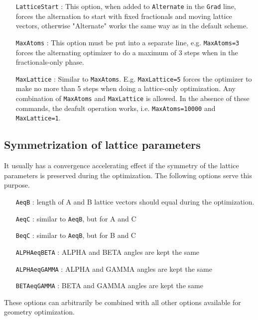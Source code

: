 \documentclass[prl,aps,preprint,superbib,12pt]{revtex4}
\begin{document}
\begin{itemize}
\item[{\tt LatticeStart}] :
This option, when added to {\tt Alternate} in the {\tt Grad} line,
forces the alternation to start with fixed fractionals and moving
lattice vectors, otherwise "Alternate" works the same way as in the 
default scheme.
\end{itemize}

\begin{itemize}
\item[{\tt MaxAtoms}] :
This option must be put into a separate line, e.g. {\tt MaxAtoms=3}
forces the alternating optimizer to do a maximum of 3 steps 
when in the fractionals-only phase.    
\end{itemize}

\begin{itemize}
\item[{\tt MaxLattice}] :
Similar to {\tt MaxAtoms}. E.g. {\tt MaxLattice=5} forces the optimizer
to make no more than 5 steps when doing a lattice-only optimization.
Any combination of {\tt MaxAtoms} and {\tt MaxLattice} is allowed.
In the absence of these commands, the deafult operation works, i.e.
{\tt MaxAtoms=10000} and {\tt MaxLattice=1}.
\end{itemize}

\subsection{Symmetrization of lattice parameters}
It usually has a convergence accelerating effect if the symmetry of the
lattice parameters is preserved during the optimization.
The following options serve this purpose.
\begin{itemize}
\item[{\tt AeqB}] : length of A and B lattice vectors should equal 
during the optimization.
\item[{\tt AeqC}] : similar to {\tt AeqB}, but for A and C
\item[{\tt BeqC}] : similar to {\tt AeqB}, but for B and C
\item[{\tt ALPHAeqBETA}] : ALPHA and BETA angles are kept the same
\item[{\tt ALPHAeqGAMMA}] : ALPHA and GAMMA angles are kept the same
\item[{\tt BETAeqGAMMA}] : BETA and GAMMA angles are kept the same
\end{itemize}
These options can arbitrarily be combined with all other options 
available for geometry optimization.
\end{document}
